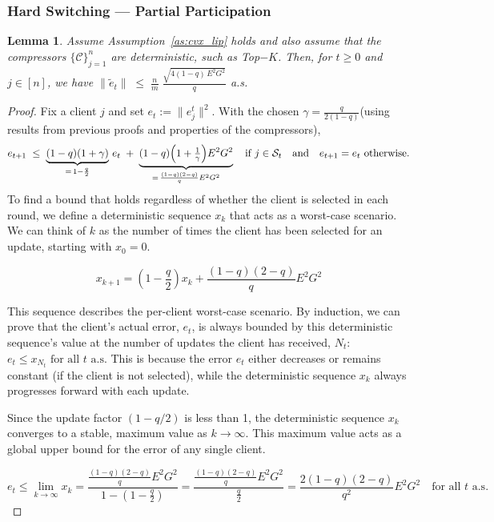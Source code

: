 \documentclass{article} %
\newtheorem{lemma}[]{Lemma}
\def\C{{\mathcal C}}
\def\S{{\mathcal S}}
\begin{document}
\subsubsection{Hard Switching --- Partial Participation}
\begin{lemma}
\label{lem:uniform_ef_uplink}
Assume Assumption~\ref{as:cvx_lip} holds and also assume that the compressors $\{\C\}_{j=1}^n$ are deterministic, such as Top$-K$. Then, for $t \geq 0$ and $j \in [n]$, we have $\|\tilde e_t\| \;\le\; \frac{n}{m}\;\frac{\sqrt{4(1-q)\,E^2G^2}}{q}$ a.s.
\end{lemma}
\begin{proof}
Fix a client $j$ and set $e_t:=\|e_j^t\|^2$. With the chosen $\gamma = \frac{q}{2(1-q)}$(using results from previous proofs and properties of the compressors),
\[
e_{t+1} \;\le\; \underbrace{(1-q)(1+\gamma)}_{=\,1-\frac{q}{2}}\,e_t
\;+\; \underbrace{(1-q)\Bigl(1+\tfrac{1}{\gamma}\Bigr)E^2G^2}_{=\,\frac{(1-q)(2-q)}{q}E^2G^2}
\quad\text{if } j\in \S_t
\quad\text{and}\quad e_{t+1}=e_t \text{ otherwise.}
\]
To find a bound that holds regardless of whether the client is selected in each round, we define a deterministic sequence $x_k$ that acts as a worst-case scenario. We can think of $k$ as the number of times the client has been selected for an update, starting with $x_0 = 0$.

\begin{equation*}
x_{k+1} = \left(1-\frac{q}{2}\right)x_k + \frac{(1-q)(2-q)}{q}E^2G^2
\end{equation*}

This sequence describes the per-client worst-case scenario. By induction, we can prove that the client's actual error, $e_t$, is always bounded by this deterministic sequence's value at the number of updates the client has received, $N_t$:
$e_t \le x_{N_t} \text{ for all } t \text{ a.s.}$ This is because the error $e_t$ either decreases or remains constant (if the client is not selected), while the deterministic sequence $x_k$ always progresses forward with each update.


Since the update factor $(1 - q/2)$ is less than 1, the deterministic sequence $x_k$ converges to a stable, maximum value as $k \to \infty$. This maximum value acts as a global upper bound for the error of any single client.

\begin{equation*}
e_t \le \lim_{k \to \infty} x_k = \frac{\frac{(1-q)(2-q)}{q}E^2G^2}{1 - \left(1-\frac{q}{2}\right)} = \frac{\frac{(1-q)(2-q)}{q}E^2G^2}{\frac{q}{2}} = \frac{2(1-q)(2-q)}{q^2}E^2G^2 \quad \text{for all } t \text{ a.s.}
\end{equation*}


\end{proof}
\end{document}
